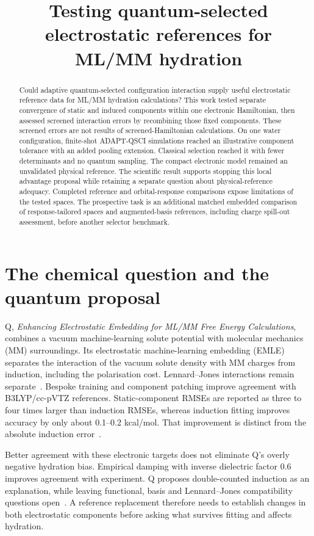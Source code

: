 \documentclass{article}
\title{Testing quantum-selected electrostatic references for ML/MM hydration}
\begin{document}
\maketitle

\begin{abstract}
Could adaptive quantum-selected configuration interaction supply useful electrostatic reference data for ML/MM hydration calculations? This work tested separate convergence of static and induced components within one electronic Hamiltonian, then assessed screened interaction errors by recombining those fixed components. These screened errors are not results of screened-Hamiltonian calculations. On one water configuration, finite-shot ADAPT-QSCI simulations reached an illustrative component tolerance with an added pooling extension. Classical selection reached it with fewer determinants and no quantum sampling. The compact electronic model remained an unvalidated physical reference. The scientific result supports stopping this local advantage proposal while retaining a separate question about physical-reference adequacy. Completed reference and orbital-response comparisons expose limitations of the tested spaces. The prospective task is an additional matched embedded comparison of response-tailored spaces and augmented-basis references, including charge spill-out assessment, before another selector benchmark.
\end{abstract}

\section{The chemical question and the quantum proposal}
Q, \emph{Enhancing Electrostatic Embedding for ML/MM Free Energy Calculations}, combines a vacuum machine-learning solute potential with molecular mechanics (MM) surroundings. Its electrostatic machine-learning embedding (EMLE) separates the interaction of the vacuum solute density with MM charges from induction, including the polarisation cost. Lennard--Jones interactions remain separate~\cite{Q}. Bespoke training and component patching improve agreement with B3LYP/cc-pVTZ references. Static-component RMSEs are reported as three to four times larger than induction RMSEs, whereas induction fitting improves accuracy by only about 0.1--0.2 kcal/mol. That improvement is distinct from the absolute induction error~\cite{Q}.

Better agreement with these electronic targets does not eliminate Q's overly negative hydration bias. Empirical damping with inverse dielectric factor 0.6 improves agreement with experiment. Q proposes double-counted induction as an explanation, while leaving functional, basis and Lennard--Jones compatibility questions open~\cite{Q}. A reference replacement therefore needs to establish changes in both electrostatic components before asking what survives fitting and affects hydration.
\end{document}
